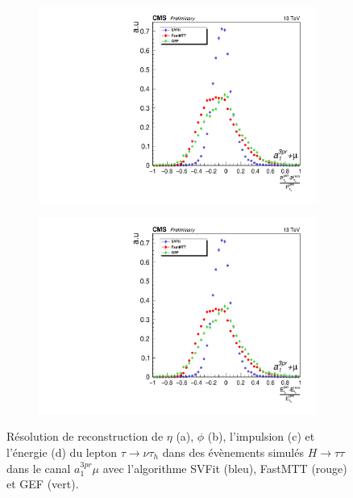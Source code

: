 \begin{figure}[!ht]
  \begin{subfigure}[b]{0.5\linewidth}
    \centering
    \includegraphics[width=\linewidth]{Chapitre6/Images/P.pdf} 
    \caption{} 
  \end{subfigure}%
  \begin{subfigure}[b]{0.5\linewidth}
    \centering
    \includegraphics[width=\linewidth]{Chapitre6/Images/E.pdf} 
    \caption{} 
  \end{subfigure} 
  \caption{Résolution de reconstruction de $\eta$ (a), $\phi$ (b), l'impulsion (c) et l'énergie (d) du lepton $\tau\rightarrow\nu\tau_h$ dans des évènements simulés $H\rightarrow\tau\tau$ dans le canal $a_1^{3pr}\mu$ avec l'algorithme SVFit (bleu), FastMTT (rouge) et GEF (vert).}
  \label{TauRes}
\end{figure}

